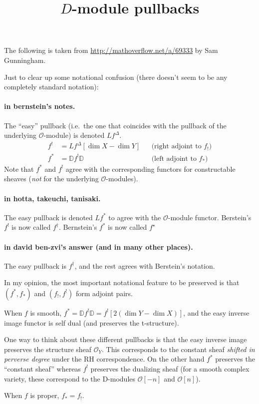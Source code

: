 \documentclass[english, no-theorem-numbers]{short-notes}
\title{\texorpdfstring{$D$}{D}-module pullbacks}
\author{}
\begin{document}
\maketitle

The following is taken from \url{http://mathoverflow.net/a/69333} by Sam Gunningham.

\bigskip
\noindent Just to clear up some notational confusion (there doesn't seem to be any completely standard notation):

\paragraph{in bernstein's notes.}
The \enquote{easy} pullback (i.e.~the one that coincides with the pullback of the underlying $\mathcal O$-module) is denoted $Lf^\Delta$.
\begin{align*}
    f^! & = Lf^\Delta [\dim X - \dim Y] & & \text{(right adjoint to $f_!$)} \\
    f^\ast & = \mathbb D f^! \mathbb D & & \text{(left adjoint to $f_\ast$)}
\end{align*}
Note that $f^\ast$ and $f^!$ agree with the corresponding functors for constructable sheaves (\emph{not} for the underlying $\mathcal O$-modules).

\paragraph{in hotta, takeuchi, tanisaki.}
The easy pullback is denoted $Lf^\ast$ to agree with the $\mathcal O$-module functor.
Berstein's $f^!$ is now called $f^\dagger$.
Bernstein's $f^\ast$ is now called $f^\star$

\paragraph{in david ben-zvi's answer (and in many other places).}
The easy pullback is $f^\dagger$, and the rest agrees with Berstein's notation.

\bigskip
\noindent 
In my opinion, the most important notational feature to be preserved is that $(f^\ast , f_\ast)$ and $(f_! , f^!)$ form adjoint pairs.

When $f$ is smooth, $f^\ast = \mathbb D f^! \mathbb D = f^! [2(\dim Y - \dim X)]$, and the easy inverse image functor is self dual (and preserves the t-structure).

One way to think about these different pullbacks is that the easy inverse image preserves the structure sheaf $\mathcal O_Y$.
This corresponds to the constant sheaf \emph{shifted in perverse degree} under the RH correspondence.
On the other hand $f^\ast$ preserves the \enquote{constant sheaf} whereas $f^!$ preserves the dualizing sheaf (for a smooth complex variety, these correspond to the D-modules $\mathcal O[-n]$ and $\mathcal O[n]$).

When $f$ is proper, $f_* = f_!$.

\end{document}
